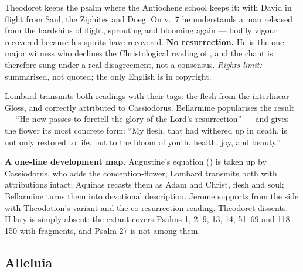 \begin{witnessnote}
Theodoret keeps the psalm where the Antiochene school keeps it: with David in
flight from Saul, the Ziphites and Doeg. On v.~7 he understands a man released
from the hardships of flight, sprouting and blooming again --- bodily vigour
recovered because his spirits have recovered. \textbf{No resurrection.} He is
the one major witness who declines the Christological reading of
, and the chant is therefore sung under a real
disagreement, not a consensus. \textit{Rights limit:} summarised, not quoted;
the only English is in copyright.
\end{witnessnote}

\begin{witnessnote}
Lombard transmits both readings with their tags: the flesh  from the interlinear Gloss, and  correctly attributed to
Cassiodorus. Bellarmine popularises the result --- ``He now passes to foretell
the glory of the Lord's resurrection'' --- and gives the flower its most
concrete form: ``My flesh, that had withered up in death, is not only restored
to life, but to the bloom of youth, health, joy, and beauty.''
\end{witnessnote}

\textbf{A one-line development map.} Augustine's equation
() is taken up by Cassiodorus, who adds the
conception-flower; Lombard transmits both with attributions intact; Aquinas
recasts them as Adam and Christ, flesh and soul; Bellarmine turns them into
devotional description. Jerome supports from the side with Theodotion's variant
and the co-resurrection reading. Theodoret dissents. Hilary is simply absent:
the extant  covers Psalms 1, 2, 9, 13, 14, 51--69
and 118--150 with fragments, and Psalm 27 is not among them.

\elementguard
\subsection*{Alleluia }


